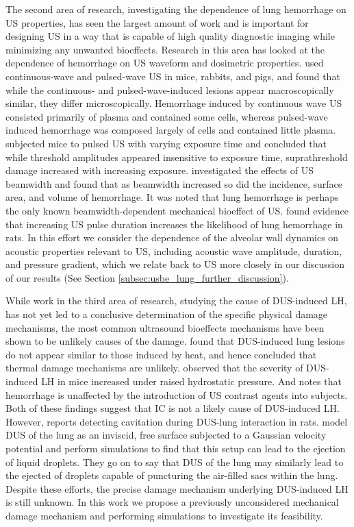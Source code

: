 The second area of research, investigating the dependence of lung
hemorrhage on \ac{US} properties, has seen the largest amount of work
and is important for designing \ac{US} in a way that is capable of
high quality diagnostic imaging while minimizing any unwanted
bioeffects. Research in this area has looked at the dependence of
hemorrhage on \ac{US} waveform and dosimetric properties.
\cite{Zachary1995a} used continuous-wave and pulsed-wave \ac{US} in
mice, rabbits, and pigs, and found that while the continuous- and
pulsed-wave-induced lesions appear macroscopically similar, they
differ microscopically.  Hemorrhage induced by continuous wave \ac{US}
consisted primarily of plasma and contained some cells, whereas
pulsed-wave induced hemorrhage was composed largely of cells and
contained little plasma. \cite{Raeman1996} subjected mice to pulsed
\ac{US} with varying exposure time and concluded that while threshold
amplitudes appeared insensitive to exposure time, suprathreshold
damage increased with increasing exposure. \cite{OBrien2001}
investigated the effects of \ac{US} beamwidth and found that as
beamwidth increased so did the incidence, surface area, and volume of
hemorrhage. It was noted that lung hemorrhage is perhaps the only
known beamwidth-dependent mechanical bioeffect of \ac{US}.
\cite{OBrien2003c} found evidence that increasing \ac{US} pulse
duration increases the likelihood of lung hemorrhage in rats. In this
effort we consider the dependence of the alveolar wall dynamics on
acoustic properties relevant to \ac{US}, including acoustic wave
amplitude, duration, and pressure gradient, which we relate back to
\ac{US} more closely in our discussion of our results (See Section
\ref{subsec:usbe_lung_further_discussion}).

While work in the third area of research, studying the cause of
\ac{DUS}-induced \ac{LH}, has not yet led to a conclusive
determination of the specific physical damage mechanisms, the most
common ultrasound bioeffects mechanisms have been shown to be unlikely
causes of the damage. \cite{Zachary2006} found that \ac{DUS}-induced
lung lesions do not appear similar to those induced by heat, and hence
concluded that thermal damage mechanisms are
unlikely. \cite{OBrien2000} observed that the severity of
\ac{DUS}-induced \ac{LH} in mice increased under raised hydrostatic
pressure. And \cite{Raeman1996} notes that hemorrhage is unaffected by
the introduction of \ac{US} contrast agents into subjects. Both of
these findings suggest that \ac{IC} is not a likely cause of
\ac{DUS}-induced \ac{LH}. However, \cite{Holland1996} reports
detecting cavitation during \ac{DUS}-lung interaction in
rats. \cite{Tjan2007,Tjan2008} model \ac{DUS} of the lung as an
inviscid, free surface subjected to a Gaussian velocity potential and
perform simulations to find that this setup can lead to the ejection
of liquid droplets. They go on to say that \ac{DUS} of the lung may
similarly lead to the ejected of droplets capable of puncturing the
air-filled sacs within the lung. Despite these efforts, the precise
damage mechanism underlying \ac{DUS}-induced \ac{LH} is still
unknown. In this work we propose a previously unconsidered mechanical
damage mechanism and performing simulations to investigate its
feasibility.

